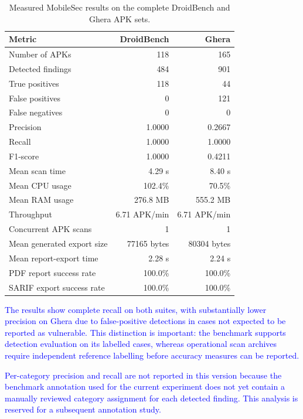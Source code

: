 \documentclass[preprint,12pt, a4paper]{elsarticle}
\begin{document}
{\color{blue}
\begin{table}[!htbp]
\centering
\caption{Measured MobileSec results on the complete DroidBench and Ghera APK sets.}
\label{tab:mobilesec-benchmark-realworld-generated}
\begin{tabular}{lrr}
\toprule
\textbf{Metric} & \textbf{DroidBench} & \textbf{Ghera} \\
\midrule
Number of APKs & 118 & 165 \\
Detected findings & 484 & 901 \\
True positives & 118 & 44 \\
False positives & 0 & 121 \\
False negatives & 0 & 0 \\
Precision & 1.0000 & 0.2667 \\
Recall & 1.0000 & 1.0000 \\
F1-score & 1.0000 & 0.4211 \\
Mean scan time & 4.29 s & 8.40 s \\
Mean CPU usage & 102.4\% & 70.5\% \\
Mean RAM usage & 276.8 MB & 555.2 MB \\
Throughput & 6.71 APK/min & 6.71 APK/min \\
Concurrent APK scans & 1 & 1 \\
Mean generated export size & 77165 bytes & 80304 bytes \\
Mean report-export time & 2.28 s & 2.24 s \\
PDF report success rate & 100.0\% & 100.0\% \\
SARIF export success rate & 100.0\% & 100.0\% \\
\bottomrule
\end{tabular}
\end{table}
}

\textcolor{blue}{The results show complete recall on both suites, with substantially lower precision on Ghera due to false-positive detections in cases not expected to be reported as vulnerable. This distinction is important: the benchmark supports detection evaluation on its labelled cases, whereas operational scan archives require independent reference labelling before accuracy measures can be reported.}

\textcolor{blue}{Per-category precision and recall are not reported in this version because the benchmark annotation used for the current experiment does not yet contain a manually reviewed category assignment for each detected finding. This analysis is reserved for a subsequent annotation study.}
\end{document}
